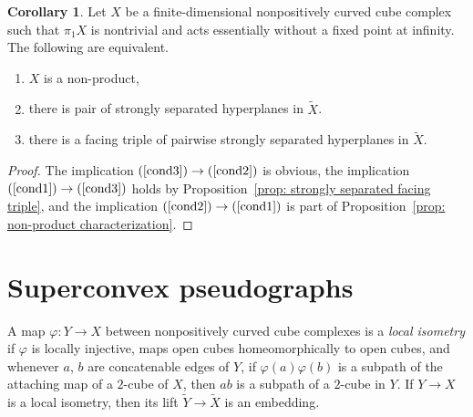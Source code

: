 \documentclass[12pt,oneside]{amsart}
\theoremstyle{definition}
\newtheorem{cor}[thm]{Corollary}
\theoremstyle{definition}
\theoremstyle{remark}
\begin{document}
\begin{cor}\label{cor: facing triple implies strongly separated facing triple}
    Let $X$ be a finite-dimensional nonpositively curved cube complex such that $\pi_1 X$ is nontrivial and acts essentially without a fixed point at infinity. The following are equivalent.
    \begin{enumerate}
        \item\label{cond1} $X$ is a non-product,
        \item\label{cond2} there is pair of strongly separated hyperplanes in $\widetilde X$.
        \item\label{cond3} there is a facing triple of pairwise strongly separated hyperplanes in $\widetilde X$.
        
    \end{enumerate}
\end{cor}
\begin{proof}
    The implication $(\ref{cond3})\to (\ref{cond2})$ is obvious, the implication $(\ref{cond1})\to (\ref{cond3})$ holds by %
Proposition~\ref{prop: strongly separated facing triple}, and the implication $(\ref{cond2})\to (\ref{cond1})$ is part of Proposition~\ref{prop: non-product characterization}.
    \end{proof}




\section{Superconvex pseudographs}\label{sec:pseudograph}

A map $\varphi:Y \rightarrow X$ between
nonpositively curved cube complexes is a \emph{local isometry} if $\varphi$ is locally injective, maps open cubes homeomorphically to open cubes, and whenever $a$, $b$ are concatenable edges of $Y$, if $\varphi(a)\varphi(b)$ is a subpath of the attaching map of a $2$-cube of $X$, then $ab$ is a subpath of a $2$-cube in $Y$. If $Y\to X$ is a local isometry, then its lift $\widetilde Y \to \widetilde X$ is an embedding.
\end{document}

